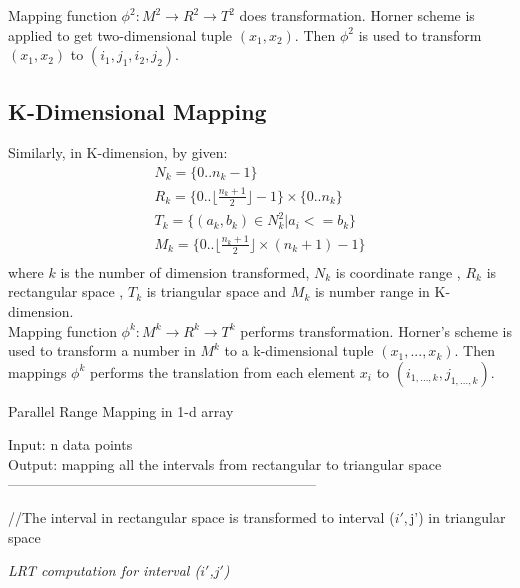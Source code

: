 \documentclass[AMA,LATO1COL]{WileyNJD-v2-bak}
\begin{document}
Mapping function $\phi^2: M^2 \rightarrow R^2 \rightarrow T^2$ does transformation. Horner scheme is applied to get two-dimensional tuple $(x_1,x_2)$. Then $\phi^2$ is used to transform $(x_1,x_2)$ to $(i_1,j_1,i_2,j_2)$.

\subsection{K-Dimensional Mapping}
Similarly, in K-dimension, by given:
\begin{eqnarray}
& N_k = \{0..n_k-1\}          & \\
& R_k = \{0..\lfloor \frac{n_k+1}{2}\rfloor-1\} \times \{0..n_k\}&\\
& T_k = \{(a_k,b_k) \in  N_k^2 | a_i<=b_k\}&\\
& M_k = \{0.. \lfloor \frac{n_k+1}{2}\rfloor \times (n_k+1)-1\}&\\
\end{eqnarray}
where $k$ is the number of dimension transformed, $N_k$ is coordinate range , $R_k$ is rectangular space , $T_k$ is triangular space and $M_k$ is number range in K-dimension.\\

Mapping function $\phi^k: M^k \rightarrow R^k \rightarrow T^k$ performs transformation. Horner's scheme is used to transform a number in $M^k$ to a k-dimensional tuple $(x_1, ...,x_k)$. Then mappings $\phi^k$ performs the translation from each element $x_i$ to $(i_{1,...,k},j_{1,...,k})$.

\begin{algorithm}[t!]
\label{RM}
\caption{ Parallel Range Mapping in 1-d array}\label{RM}
Input:  n data points \\
Output: mapping all the intervals from rectangular to triangular space\\
------------------------------------------------------------------ \\
\begin{algorithmic}[1]
\State //The interval  in rectangular space is transformed to interval ($i',$j') in triangular space
\Else
{}

\EndIf
\EndIf
\State \textit {LRT computation for interval (${i\prime}$,${j\prime}$)}
\EndFor
\EndFor
\end{algorithmic}
\end{algorithm}
\end{document}
